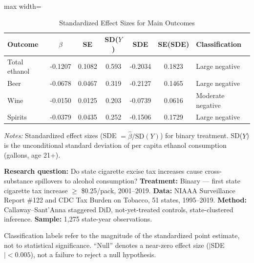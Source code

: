 \begin{table}[H]
\centering
\caption{Standardized Effect Sizes for Main Outcomes}
\label{tab:sde}
\begin{threeparttable}
\begin{adjustbox}{max width=\textwidth}
\begin{tabular}{lcccccl}
\toprule
Outcome & $\hat{\beta}$ & SE & SD($Y$) & SDE & SE(SDE) & Classification \\
\midrule
Total ethanol & -0.1207 & 0.1082 & 0.593 & -0.2034 & 0.1823 & Large negative \\
Beer & -0.0678 & 0.0467 & 0.319 & -0.2127 & 0.1465 & Large negative \\
Wine & -0.0150 & 0.0125 & 0.203 & -0.0739 & 0.0616 & Moderate negative \\
Spirits & -0.0379 & 0.0435 & 0.252 & -0.1506 & 0.1729 & Large negative \\
\bottomrule
\end{tabular}
\end{adjustbox}
\begin{tablenotes}[flushleft]
\small
\item \textit{Notes:} Standardized effect sizes (SDE $= \hat{\beta}/\text{SD}(Y)$) for binary treatment. SD($Y$) is the unconditional standard deviation of per capita ethanol consumption (gallons, age 21+).

\textbf{Research question:} Do state cigarette excise tax increases cause cross-substance spillovers to alcohol consumption? \textbf{Treatment:} Binary --- first state cigarette tax increase $\geq$ \$0.25/pack, 2001--2019. \textbf{Data:} NIAAA Surveillance Report \#122 and CDC Tax Burden on Tobacco, 51 states, 1995--2019. \textbf{Method:} Callaway--Sant'Anna staggered DiD, not-yet-treated controls, state-clustered inference. \textbf{Sample:} 1,275 state-year observations.

Classification labels refer to the magnitude of the standardized point estimate, not to statistical significance. ``Null'' denotes a near-zero effect size ($|$SDE$| < 0.005$), not a failure to reject a null hypothesis.
\end{tablenotes}
\end{threeparttable}
\end{table}
